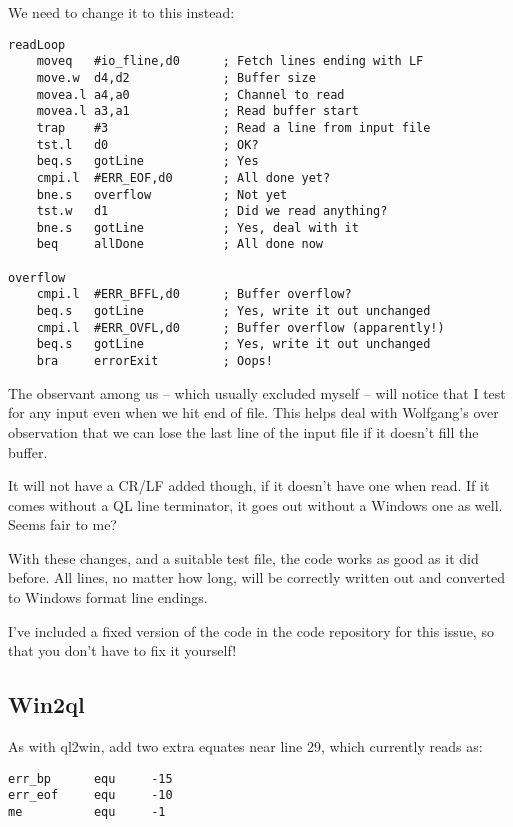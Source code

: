 We need to change it to this instead:

\begin{lstlisting}[showstringspaces=false,tabsize=4]
readLoop
    moveq   #io_fline,d0      ; Fetch lines ending with LF
    move.w  d4,d2             ; Buffer size
    movea.l a4,a0             ; Channel to read
    movea.l a3,a1             ; Read buffer start
    trap    #3                ; Read a line from input file
    tst.l   d0                ; OK?
    beq.s   gotLine           ; Yes
    cmpi.l  #ERR_EOF,d0       ; All done yet?
    bne.s   overflow          ; Not yet
    tst.w   d1                ; Did we read anything?
    bne.s   gotLine           ; Yes, deal with it
    beq     allDone           ; All done now

overflow
    cmpi.l  #ERR_BFFL,d0      ; Buffer overflow?
    beq.s   gotLine           ; Yes, write it out unchanged
    cmpi.l  #ERR_OVFL,d0      ; Buffer overflow (apparently!)
    beq.s   gotLine           ; Yes, write it out unchanged   
    bra     errorExit         ; Oops!
\end{lstlisting}

The observant among us -- which usually excluded myself -- will
notice that I test for any input even when we hit end of file. This
helps deal with Wolfgang's over observation that we can lose the last
line of the input file if it doesn't fill the buffer.

It will not have a CR/LF added though, if it doesn't have one when
read. If it comes without a QL line terminator, it goes out without
a Windows one as well. Seems fair to me?

With these changes, and a suitable test file, the code works as good
as it did before. All lines, no matter how long, will be correctly
written out and converted to Windows format line endings.

I've included a fixed version of the code in the code repository for
this issue, so that you don't have to fix it yourself!

\subsection{Win2ql}

As with ql2win, add two extra equates near line 29, which currently
reads as:

\begin{lstlisting}[showstringspaces=false,tabsize=4]
err_bp      equ     -15
err_eof     equ     -10
me          equ     -1
\end{lstlisting}

